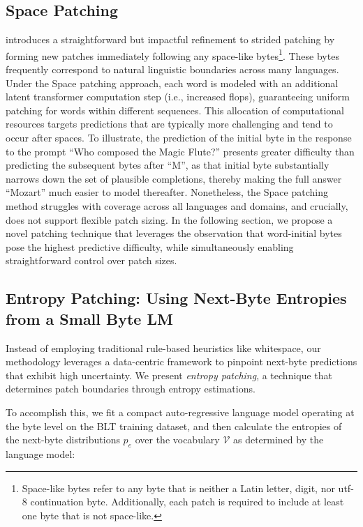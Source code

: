\subsection{Space Patching}
\label{section:white-patch}

\citet{slagle2024spacebyte} introduces a straightforward but impactful refinement to strided patching by forming new patches immediately following any space-like bytes\footnote{
    Space-like bytes refer to any byte that is neither a Latin letter, digit, nor utf-8 continuation byte. Additionally, each patch is required to include at least one byte that is not space-like. }. These bytes frequently correspond to natural linguistic boundaries across many languages. Under the Space patching approach, each word is modeled with an additional latent transformer computation step (i.e., increased flops), guaranteeing uniform patching for words within different sequences. This allocation of computational resources targets predictions that are typically more challenging and tend to occur after spaces. To illustrate, the prediction of the initial byte in the response to the prompt ``Who composed the Magic Flute?\uline{\hspace{.6em}}'' presents greater difficulty than predicting the subsequent bytes after ``M'', as that initial byte substantially narrows down the set of plausible completions, thereby making the full answer ``Mozart'' much easier to model thereafter. Nonetheless, the Space patching method struggles with coverage across all languages and domains, and crucially, does not support flexible patch sizing. In the following section, we propose a novel patching technique that leverages the observation that word-initial bytes pose the highest predictive difficulty, while simultaneously enabling straightforward control over patch sizes.

\subsection{Entropy Patching: Using Next-Byte Entropies from a Small Byte LM}
\label{section:dyn-patch}

Instead of employing traditional rule-based heuristics like whitespace, our methodology leverages a data-centric framework to pinpoint next-byte predictions that exhibit high uncertainty. We present \textit{entropy patching}, a technique that determines patch boundaries through entropy estimations.

To accomplish this, we fit a compact auto-regressive language model operating at the byte level on the {\textsc BLT} training dataset, and then calculate the entropies of the next-byte distributions $p_{e}$ over the vocabulary $\mathcal{V}$ as determined by the language model:


